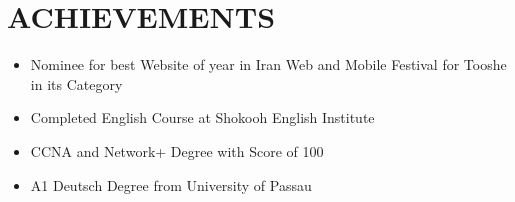 \documentclass[11pt,a4paper,roman]{moderncv}        %
\begin{document}
{{}


\section{ACHIEVEMENTS}
\begin{minipage}{\maincolumnwidth}%
	\small{
    	\begin{itemize}
          \item Nominee for best Website of year in Iran Web and Mobile Festival for Tooshe in its Category
          \item Completed English Course at Shokooh English Institute
          \item CCNA and Network+ Degree with Score of 100
          \item A1 Deutsch Degree from University of Passau 
		\end{itemize}}%
\end{minipage}%
      
}
\nocite{*}



\end{document}
